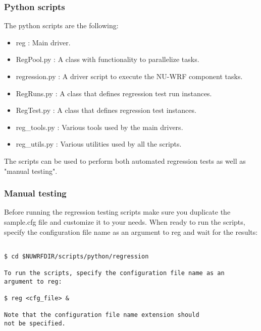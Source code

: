 \begin{frame}[fragile]\frametitle{Python scripts}

The python scripts are the following:
\begin{itemize}
\item reg : Main driver.
\item RegPool.py    : A class with functionality to parallelize tasks.
\item regression.py : A driver script to execute the NU-WRF component tasks.
\item RegRuns.py    : A class that defines regression test run instances.
\item RegTest.py    : A class that defines regression test instances.
\item reg\_tools.py  : Various tools used by the main drivers.
\item reg\_utils.py  : Various utilities used by all the scripts.
\end{itemize}
The scripts can be used to perform both automated regression tests as well as "manual testing".
\end{frame}

\begin{frame}[fragile]\frametitle{Manual testing}

Before running the regression testing scripts make sure you duplicate the sample.cfg file 
and customize it to your needs. When ready to run the scripts, specify the configuration file 
name as an argument to reg and wait for the results:

\footnotesize{
\begin{verbatim}

$ cd $NUWRFDIR/scripts/python/regression 

To run the scripts, specify the configuration file name as an 
argument to reg:

$ reg <cfg_file> &

Note that the configuration file name extension should 
not be specified.
\end{verbatim}
}

\end{frame}

